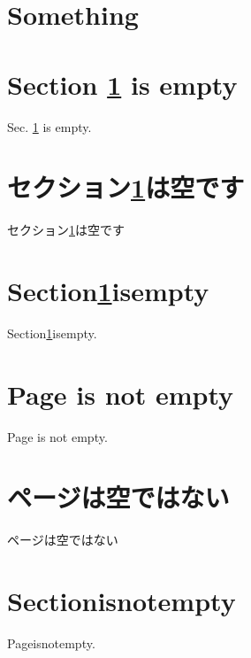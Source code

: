 \documentclass[twocolumn]{jarticle}
\begin{document}
\tableofcontents
\section{Something}\label{a}
\section{Section \ref{a} is empty}
Sec. \ref{a} is empty.
\section{セクション\ref{a}は空です}
セクション\ref{a}は空です
\section{Section\ref{a}isempty}
Section\ref{a}isempty.
\section{Page \pageref{a} is not empty}
Page \pageref{a} is not empty.
\section{ページ\pageref{a}は空ではない}
ページ\pageref{a}は空ではない
\section{Section\pageref{a}isnotempty}
Page\pageref{a}isnotempty.
\end{document}
